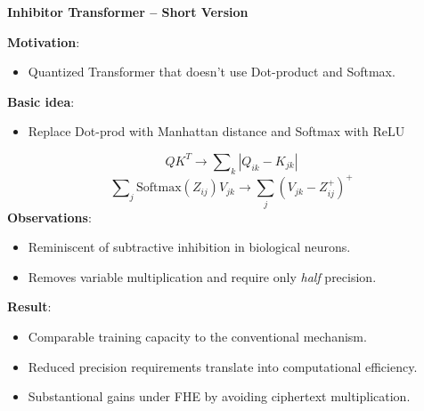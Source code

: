 \documentclass[12pt,oneside]{book}
\begin{document}
\begin{framed}
\begin{center}
    \Huge \textbf{Inhibitor Transformer -- Short Version}
\end{center}    
\Large
\noindent
\textbf{Motivation}: \begin{itemize}
    \item Quantized Transformer that doesn't use Dot-product and Softmax.
\end{itemize}

\noindent
\textbf{Basic idea}: 
\begin{itemize}
    \item Replace Dot-prod with Manhattan distance and Softmax with ReLU
\end{itemize}
\begin{equation*}
Q K^T \rightarrow \sum\nolimits_{k} \left|Q_{ik} - K_{jk}\right|
\end{equation*}
\begin{equation*}
\sum\nolimits_{j} \mathrm{Softmax} \left(Z_{ij}\right) V_{jk}  \rightarrow \sum_j \left( V_{jk} - Z_{ij}^+  \right)^+
    \label{eq:inhibition}
\end{equation*}
%
\noindent
\textbf{Observations}:
\begin{itemize}%
    \item Reminiscent of subtractive inhibition in biological neurons.
    \item Removes variable multiplication and require only \textit{half} precision.
\end{itemize}

\noindent
\textbf{Result}: 

\begin{itemize}
    \item Comparable training capacity to the conventional mechanism.
    \item Reduced precision requirements translate into computational efficiency.
    \item Substantional gains under FHE by avoiding ciphertext multiplication.
\end{itemize}


\end{framed}
\end{document}
